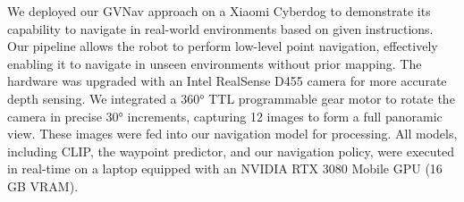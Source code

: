 
We deployed our GVNav approach on a Xiaomi Cyberdog to demonstrate its capability to navigate in real-world environments based on given instructions. Our pipeline allows the robot to perform low-level point navigation, effectively enabling it to navigate in unseen environments without prior mapping. The hardware was upgraded with an Intel RealSense D455 camera for more accurate depth sensing. We integrated a 360° TTL programmable gear motor to rotate the camera in precise 30° increments, capturing 12 images to form a full panoramic view. These images were fed into our navigation model for processing. All models, including CLIP, the waypoint predictor, and our navigation policy, were executed in real-time on a laptop equipped with an NVIDIA RTX 3080 Mobile GPU (16 GB VRAM).

